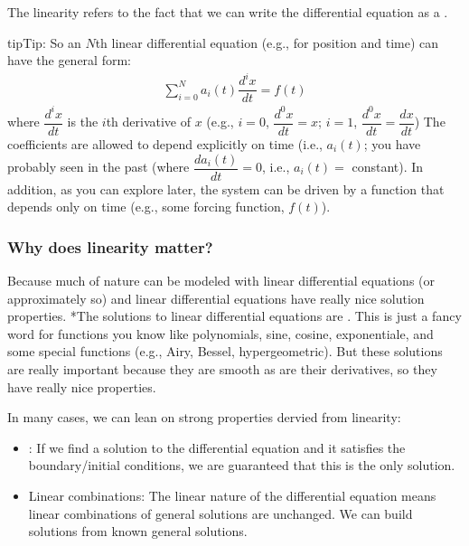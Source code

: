 \documentclass[letterpaper,10pt,english]{jupyterBook}
\begin{document}
\sphinxAtStartPar
{}

\sphinxAtStartPar
The linearity refers to the fact that we can write the differential equation as a .

\begin{sphinxadmonition}{tip}{Tip:}
\sphinxAtStartPar
So an \(N\)th linear differential equation (e.g., for position and time) can have the general form:
\begin{equation*}
\begin{split}\sum_{i=0}^N a_i(t)\dfrac{d^ix}{dt} = f(t)\end{split}
\end{equation*}
\sphinxAtStartPar
where \(\dfrac{d^ix}{dt}\) is the \(i\)th derivative of \(x\) (e.g., \(i=0\), \(\dfrac{d^0x}{dt}=x\); \(i=1\), \(\dfrac{d^0x}{dt}=\dfrac{dx}{dt}\)) The coefficients are allowed to depend explicitly on time (i.e., \(a_i(t)\); you have probably seen  in the past (where \(\dfrac{da_i(t)}{dt}=0\), i.e., \(a_i(t) =\) constant). In addition, as you can explore later, the system can be driven by a function that depends only on time (e.g., some forcing function, \(f(t)\)).
\end{sphinxadmonition}


\subsubsection{Why does linearity matter?}
\label{\detokenize{content/2_oscillations/activity-SHO_and_dynamical_systems:why-does-linearity-matter}}
\sphinxAtStartPar
Because much of nature can be modeled with linear differential equations (or approximately so) and linear differential equations have really nice solution properties. *The solutions to linear differential equations are . This is just a fancy word for functions you know like polynomials, sine, cosine, exponentiale, and some special functions (e.g., Airy, Bessel, hypergeometric). But these solutions are really important because they are smooth as are their derivatives, so they have really nice properties.

\sphinxAtStartPar
In many cases, we can lean on strong properties dervied from linearity:
\begin{itemize}
\item {} 
\sphinxAtStartPar
{}: If we find a solution to the differential equation and it satisfies the boundary/initial conditions, we are guaranteed that this is the only solution.

\item {} 
\sphinxAtStartPar
Linear combinations: The linear nature of the differential equation means linear combinations of general solutions are unchanged. We can build solutions from known general solutions.

\end{itemize}
\end{document}
